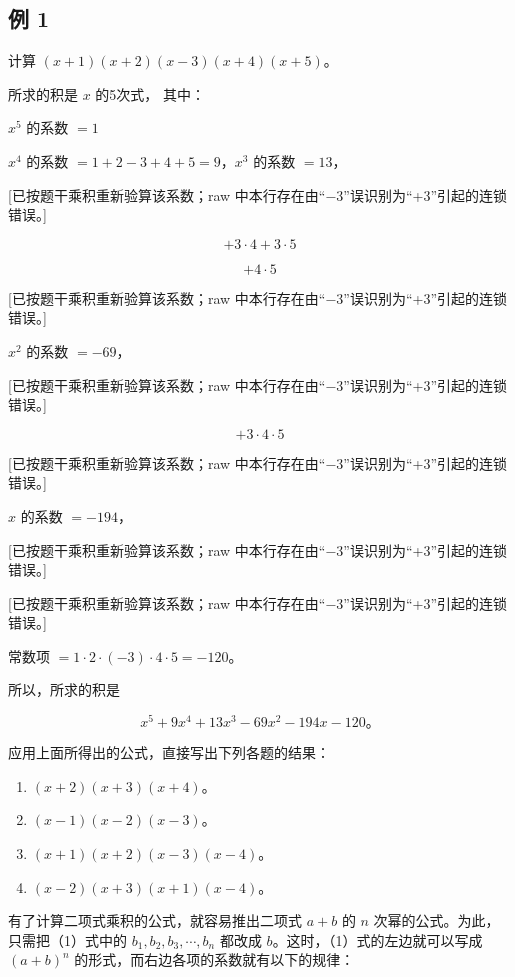 \subsection{例 1}

计算 \((x + 1)(x + 2)(x - 3)(x + 4)(x + 5)\)。

 所求的积是 \(x\) 的5次式， 其中：

\(x^5\) 的系数 \(= 1\)

\(x^4\) 的系数 \(=1+2-3+4+5=9\)，\(x^3\) 的系数 \(=13\)，

{[}已按题干乘积重新验算该系数；raw
中本行存在由``−3''误识别为``+3''引起的连锁错误。{]}

\[
+ 3 \cdot 4 + 3 \cdot 5
\]

\[
+ 4 \cdot 5
\]

{[}已按题干乘积重新验算该系数；raw
中本行存在由``−3''误识别为``+3''引起的连锁错误。{]}

\(x^2\) 的系数 \(=-69\)，

{[}已按题干乘积重新验算该系数；raw
中本行存在由``−3''误识别为``+3''引起的连锁错误。{]}

\[
+ 3 \cdot 4 \cdot 5
\]

{[}已按题干乘积重新验算该系数；raw
中本行存在由``−3''误识别为``+3''引起的连锁错误。{]}

\(x\) 的系数 \(=-194\)，

{[}已按题干乘积重新验算该系数；raw
中本行存在由``−3''误识别为``+3''引起的连锁错误。{]}

{[}已按题干乘积重新验算该系数；raw
中本行存在由``−3''误识别为``+3''引起的连锁错误。{]}

常数项 \(=1\cdot2\cdot(-3)\cdot4\cdot5=-120\)。

所以，所求的积是

\[
x^5+9x^4+13x^3-69x^2-194x-120\text{。}
\]

应用上面所得出的公式，直接写出下列各题的结果：

\begin{enumerate}
\item
  \((x + 2)(x + 3)(x + 4)\)。
\item
  \((x - 1)(x - 2)(x - 3)\)。
\item
  \((x + 1)(x + 2)(x - 3)(x - 4)\)。
\item
  \((x - 2)(x + 3)(x + 1)(x - 4)\)。
\end{enumerate}

有了计算二项式乘积的公式，就容易推出二项式 \(a + b\) 的 \(n\)
次幂的公式。为此，只需把（1）式中的
\(b_{1}, b_{2}, b_{3}, \cdots, b_{n}\) 都改成
\(b\)。这时，（1）式的左边就可以写成 \((a + b)^{n}\)
的形式，而右边各项的系数就有以下的规律：

